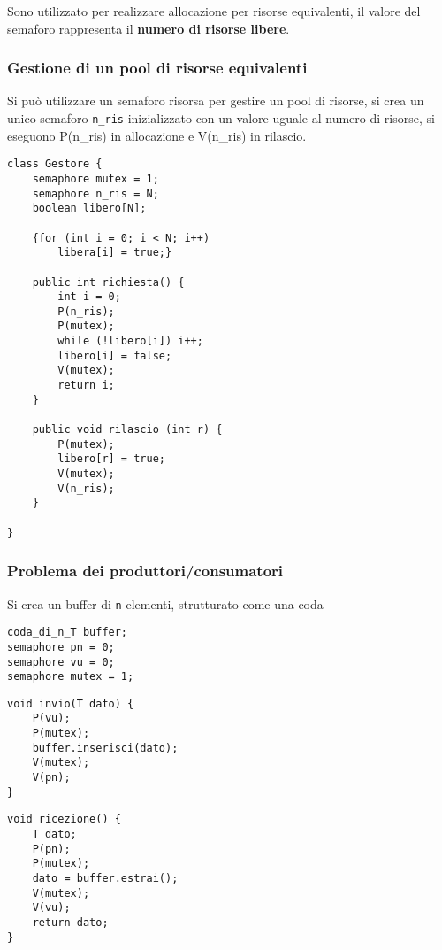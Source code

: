 Sono utilizzato per realizzare allocazione per risorse equivalenti, il valore del semaforo rappresenta il \textbf{numero di risorse libere}.

\subsubsection{Gestione di un pool di risorse equivalenti}
Si può utilizzare un semaforo risorsa per gestire un pool di risorse, si crea un unico semaforo \texttt{n\_ris} inizializzato con un valore uguale al numero di risorse, si eseguono P(n\_ris) in allocazione e V(n\_ris) in rilascio.

\begin{verbatim}
class Gestore {
    semaphore mutex = 1;
    semaphore n_ris = N;
    boolean libero[N];

    {for (int i = 0; i < N; i++)
        libera[i] = true;}

    public int richiesta() {
        int i = 0;
        P(n_ris);
        P(mutex);
        while (!libero[i]) i++;
        libero[i] = false;
        V(mutex);
        return i;
    }
    
    public void rilascio (int r) {
        P(mutex);
        libero[r] = true;
        V(mutex);
        V(n_ris);
    }

}
\end{verbatim}

\subsubsection{Problema dei produttori/consumatori}
Si crea un buffer di \texttt{n} elementi, strutturato come una coda
\begin{verbatim}
coda_di_n_T buffer;
semaphore pn = 0;
semaphore vu = 0;
semaphore mutex = 1;
\end{verbatim}

\begin{multicols}{2}
    \begin{verbatim}
void invio(T dato) {
    P(vu);
    P(mutex);
    buffer.inserisci(dato);
    V(mutex);
    V(pn);
}
    \end{verbatim}
    \columnbreak
    \begin{verbatim}
void ricezione() {
    T dato;
    P(pn);
    P(mutex);
    dato = buffer.estrai();
    V(mutex);
    V(vu);
    return dato;
}
    \end{verbatim}
\end{multicols}


